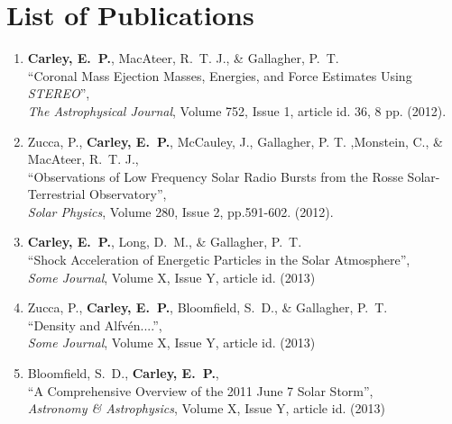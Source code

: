 \chapter{List of Publications}
\label{chapter:publications}


\begin{enumerate}

\item \textbf{Carley, E.~P.}, MacAteer, R.~T. J., \& Gallagher, P.~T.\\
``Coronal Mass Ejection Masses, Energies, and Force Estimates Using \emph{STEREO}'', \\
\emph{The Astrophysical Journal}, Volume 752, Issue 1, article id. 36, 8 pp. (2012).

\item Zucca, P., \textbf{Carley, E.~P.},  McCauley, J., Gallagher, P. T. ,Monstein, C., \& MacAteer, R.~T. J.,\\
``Observations of Low Frequency Solar Radio Bursts from the Rosse Solar-Terrestrial Observatory'', \\
\emph{Solar Physics}, Volume 280, Issue 2, pp.591-602. (2012).

\item \textbf{Carley, E.~P.}, Long, D.~M., \& Gallagher, P.~T.\\
``Shock Acceleration of Energetic Particles in the Solar Atmosphere'', \\
\emph{Some Journal}, Volume X, Issue Y, article id. (2013)

\item Zucca, P., \textbf{Carley, E.~P.}, Bloomfield, S.~D., \& Gallagher, P.~T.\\
``Density and Alfv\'{e}n....'', \\
\emph{Some Journal}, Volume X, Issue Y, article id. (2013)

\item Bloomfield, S.~D., \textbf{Carley, E.~P.},\\
``A Comprehensive Overview of the 2011 June 7 Solar Storm'', \\
\emph{Astronomy \& Astrophysics}, Volume X, Issue Y, article id. (2013)


\end{enumerate}

